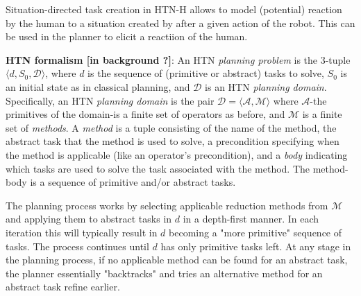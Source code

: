 \documentclass[letterpaper]{article} %
\begin{document}
Situation-directed task creation in HTN-H allows to model (potential) reaction by the human to a situation created by after a given action of the robot. This can be used in the planner to elicit a reactiion of the human.

\textbf{HTN formalism [in background ?]}:
An HTN \textit{planning problem} is the 3-tuple $\langle d, S_0, \mathcal{D} \rangle$, where $d$ is the sequence of (primitive or abstract) tasks to solve, $S_0$ is an initial state as in classical planning, and $\mathcal{D}$ is an HTN \textit{planning domain}. Specifically, an HTN \textit{planning domain} is the pair $\mathcal{D}=\langle\mathcal{A},\mathcal{M}\rangle$ where $\mathcal{A}$-the primitives of the domain-is a finite set of operators as before, and $\mathcal{M}$ is a finite set of \textit{methods}. A \textit{method} is a tuple consisting of the name of the method, the abstract task that the method is used to solve, a precondition specifying when the method is applicable (like an operator's precondition), and a \textit{body} indicating which tasks are used to solve the task associated with the method. The method-body is a sequence of primitive and/or abstract tasks. 

The planning process works by selecting applicable reduction methods from $\mathcal{M}$ and applying them to abstract tasks in $d$ in a depth-first manner. In each iteration this will typically result in $d$ becoming a "more primitive" sequence of tasks. The process continues until $d$ has only primitive tasks left. At any stage in the planning process, if no applicable method can be found for an abstract task, the planner essentially "backtracks" and tries an alternative method for an abstract task refine earlier.
\end{document}
